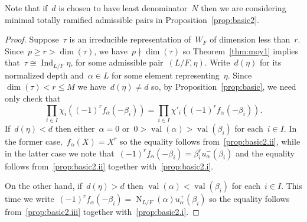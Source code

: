 \documentclass[12pt]{amsart}
\newcommand{\Ind}{\operatorname{Ind}}
\newcommand{\N}{\operatorname{N}}
\newcommand{\val}{\operatorname{val}}
\begin{document}
Note that if~$d$ is chosen to have least denominator~$N$ then we are considering minimal totally ramified admissible pairs in Proposition~\ref{prop:basic2}.

\begin{proof}
Suppose~$\tau$ is an irreducible representation of~$W_F$ of dimension less than~$r$. Since~$p\ge r > \dim(\tau)$, we have~$p\nmid \dim(\tau)$ so Theorem~\ref{thm:moy1} implies that~$\tau\cong \Ind_{L/F} \eta$, for some admissible pair~$(L/F,\eta)$. Write~$d(\eta)$ for its normalized depth and~$\alpha\in L$ for some element representing~$\eta$. Since~$\dim(\tau)<r\le M$ we have~$d(\eta)\ne d$ so, by Proposition~\ref{prop:basic}, we need only check that
\[
\prod\limits_{i\in I} \chi_i((-1)^r f_\alpha(-\beta_i)) = \prod\limits_{i\in I} \chi'_i((-1)^r f_\alpha(-\beta_i)).
\]
If~$d(\eta)<d$ then either~$\alpha=0$ or~$0>\val(\alpha)>\val(\beta_i)$ for each~$i\in I$. In the former case,~$f_\alpha(X)=X^r$ so the equality follows from~\ref{prop:basic2.ii}, while in the latter case we note that~$(-1)^r f_\alpha(-\beta_i) = \beta_i^r u^-_\alpha(\beta_i)$ and the equality follows from~\ref{prop:basic2.ii} together with~\ref{prop:basic2.i}.

On the other hand, if~$d(\eta)>d$ then $\val(\alpha)<\val(\beta_i)$ for each~$i\in I$. This time we write~$(-1)^r f_\alpha(-\beta_i) = \N_{L/F}(\alpha) u^+_\alpha(\beta_i)$ so the equality follows from~\ref{prop:basic2.iii} together with~\ref{prop:basic2.i}.
\end{proof}
\end{document}
